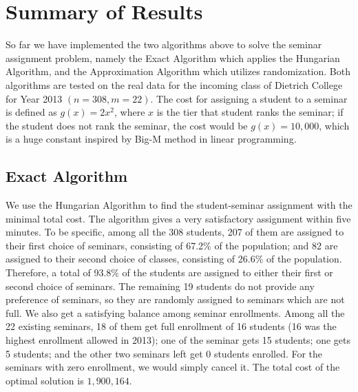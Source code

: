 \documentclass{article} %
\begin{document}
%
%
\section{Summary of Results}
    \par\qquad So far we have implemented the two algorithms above to solve the seminar assignment problem, namely the Exact Algorithm which applies the Hungarian Algorithm, and the Approximation Algorithm which utilizes randomization. Both algorithms are tested on the real data for the incoming class of Dietrich College for Year 2013 $(n=308, m=22)$. The cost for assigning a student to a seminar is defined as $g(x)=2x^2$, where $x$ is the tier that student ranks the seminar; if the student does not rank the seminar, the cost would be $g(x)=10,000$, which is a huge constant inspired by Big-M method in linear programming.

\subsection{Exact Algorithm}
\par\qquad We use the Hungarian Algorithm to find the student-seminar assignment with the minimal total cost. The algorithm gives a very satisfactory assignment within five minutes. To be specific, among all the 308 students, 207 of them are assigned to their first choice of seminars, consisting of 67.2\% of the population; and 82 are assigned to their second choice of classes, consisting of 26.6\% of the population. Therefore, a total of 93.8\% of the students are assigned to either their first or second choice of seminars. The remaining 19 students do not provide any preference of seminars, so they are randomly assigned to seminars which are not full. We also get a satisfying balance among seminar enrollments. Among all the 22 existing seminars, 18 of them get full enrollment of 16 students (16 was the highest enrollment allowed in 2013); one of the seminar gets 15 students; one gets 5 students; and the other two seminars left get 0 students enrolled. For the seminars with zero enrollment, we would simply cancel it. The total cost of the optimal solution is $1,900,164$.
\end{document}
